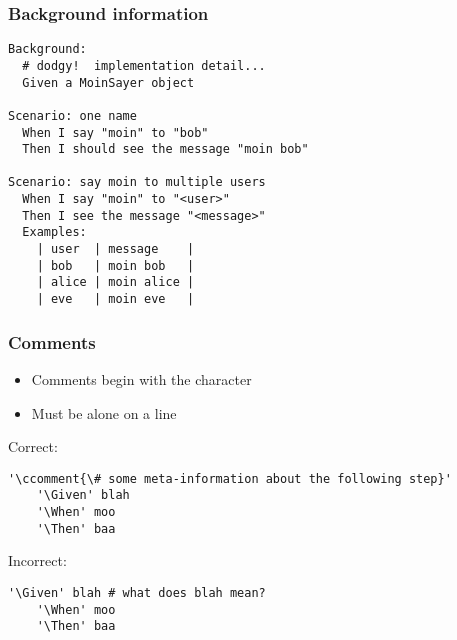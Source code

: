 \documentclass[10pt]{vcs_beamer}
\newcommand{\ccomment}[1]{\color{DarkBlue}{#1}}
\newcommand{\Given}{\color{DarkOrange}{Given}}
\newcommand{\When}{\color{RoyalBlue}{When}}
\newcommand{\Then}{\color{ForestGreen}{Then}}
\begin{document}
\begin{frame}[fragile]
\frametitle{Background information}

\begin{lstlisting}
Background:
  # dodgy!  implementation detail...
  Given a MoinSayer object

Scenario: one name
  When I say "moin" to "bob"
  Then I should see the message "moin bob"

Scenario: say moin to multiple users
  When I say "moin" to "<user>"
  Then I see the message "<message>"
  Examples:
    | user  | message    |
    | bob   | moin bob   |
    | alice | moin alice |
    | eve   | moin eve   |
\end{lstlisting}

\end{frame}

\begin{frame}[fragile]
    \frametitle{Comments}

    \begin{itemize}
        \item Comments begin with the \ttt{\#} character
        \item Must be alone on a line
    \end{itemize}

    Correct:
    \begin{lstlisting}[escapeinside='']
    '\ccomment{\# some meta-information about the following step}'
    '\Given' blah
    '\When' moo
    '\Then' baa
    \end{lstlisting}


    Incorrect:
    \begin{lstlisting}[escapeinside='']
    '\Given' blah # what does blah mean?
    '\When' moo
    '\Then' baa
    \end{lstlisting}
\end{frame}
\end{document}
